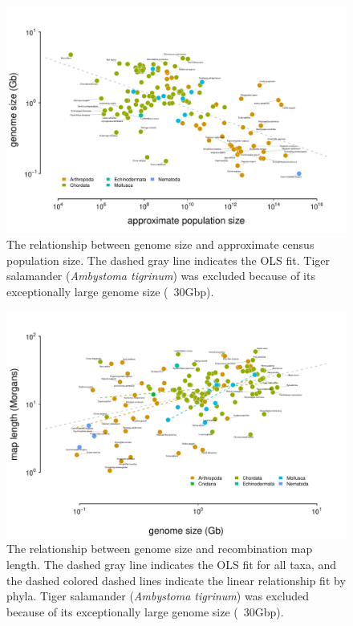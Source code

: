 \documentclass[11pt]{article}
\begin{document}
\begin{figure}[!htb]
  \centering
  \includegraphics[width=\textwidth]{figures/genome_size_popsize.pdf}

  \caption{The relationship between genome size and approximate census
    population size. The dashed gray line indicates the OLS fit. Tiger
    salamander (\emph{Ambystoma tigrinum}) was excluded because of its
  exceptionally large genome size (~30Gbp).}

  \label{supfig:genome_size_popsize}
\end{figure}


\begin{figure}[!htb]
  \centering
  \includegraphics[width=\textwidth]{figures/genome_size_maplength.pdf}

  \caption{The relationship between genome size and recombination map length.
    The dashed gray line indicates the OLS fit for all taxa, and the dashed
    colored dashed lines indicate the linear relationship fit by phyla. Tiger
    salamander (\emph{Ambystoma tigrinum}) was excluded because of its
  exceptionally large genome size (~30Gbp).}

  \label{supfig:genome_size_maplength}
\end{figure}
\end{document}
